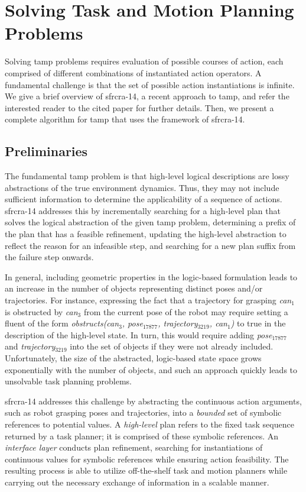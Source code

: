 \section{Solving Task and Motion Planning Problems}
Solving {\sc tamp} problems requires evaluation of possible courses of
action, each comprised of different combinations of instantiated
action operators. A fundamental challenge is that the set of possible
action instantiations is infinite.  We give a brief overview of {\sc
  sfrcra-14}, a recent approach to {\sc tamp}, and refer the
interested reader to the cited paper for further details.  Then, we
present a complete algorithm for {\sc tamp} that uses the framework of
{\sc sfrcra-14}.

\subsection{Preliminaries}
The fundamental {\sc tamp} problem is that high-level logical
descriptions are lossy abstractions of the true environment
dynamics. Thus, they may not include sufficient information to
determine the applicability of a sequence of actions.  {\sc sfrcra-14}
addresses this by incrementally searching for a high-level plan that
solves the logical abstraction of the given {\sc tamp} problem,
determining a prefix of the plan that has a feasible
refinement, updating the high-level abstraction to reflect the reason
for an infeasible step, and searching for a new plan suffix from the
failure step onwards.

In general, including geometric properties in the logic-based
formulation leads to an increase in the number of objects representing
distinct poses and/or trajectories. For instance, expressing the fact
that a trajectory for grasping \emph{can$_1$} is obstructed by
\emph{can$_3$} from the current pose of the robot may require
setting a fluent of the form \emph{obstructs(can$_3$, pose$_{17877}$,
  trajectory$_{3219}$, can$_1$)} to true in the description of the
high-level state. In turn, this would require adding
\emph{pose$_{17877}$} and \emph{trajectory$_{3219}$} into the set of
objects if they were not already included. Unfortunately, the size of
the abstracted, logic-based state space grows exponentially with the
number of objects, and such an approach quickly leads to unsolvable
task planning problems.

{\sc sfrcra-14} addresses this challenge by abstracting the continuous
action arguments, such as robot grasping poses and trajectories, into
a \emph{bounded} set of symbolic references to potential values. A
\emph{high-level} plan refers to the fixed task
sequence returned by a task planner; it is comprised of these symbolic
references. An \emph{interface layer} conducts plan refinement,
searching for instantiations of continuous values for symbolic
references while ensuring action feasibility.  The resulting process
is able to utilize off-the-shelf task and motion planners while
carrying out the necessary exchange of information in a scalable
manner.

